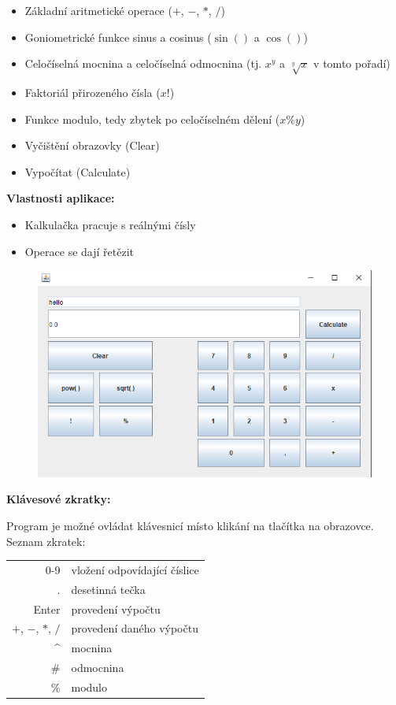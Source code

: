 \documentclass[a4paper, 11pt]{article}
\begin{document}
\begin{itemize}
    \item Základní aritmetické operace ($+$, $-$, $*$, $/$)
    \item Goniometrické funkce sinus a cosinus ($\sin()$ a $\cos()$)
    \item Celočíselná mocnina a celočíselná odmocnina (tj. $x^y$ a $\sqrt[y]{x}$ v tomto pořadí)
    \item Faktoriál přirozeného čísla ($x!$)
    \item Funkce modulo, tedy zbytek po celočíselném dělení ($x\%y$)
    \item Vyčištění obrazovky (Clear)
    \item Vypočítat (Calculate)
\end{itemize}

\noindent
\textbf{Vlastnosti aplikace:}

\begin{itemize}
    \item Kalkulačka pracuje s reálnými čísly
    \item Operace se dají řetězit%
\end{itemize}

\begin{figure}[ht]
	\centering
	\includegraphics[width=.7\textwidth]{../screenshot.png}
\end{figure}

\noindent
\textbf{Klávesové zkratky:}

Program je možné ovládat klávesnicí místo klikání na tlačítka na obrazovce. Seznam zkratek:\\

\begin{tabular}{r l}
    0-9 & vložení odpovídající číslice \\
    $.$ & desetinná tečka \\
    Enter & provedení výpočtu \\
    $+$, $-$, $*$, $/$ & provedení daného výpočtu \\
    \^{} & mocnina \\
    $\#$ & odmocnina \\
    $\%$ & modulo \\
\end{tabular}
\end{document}
